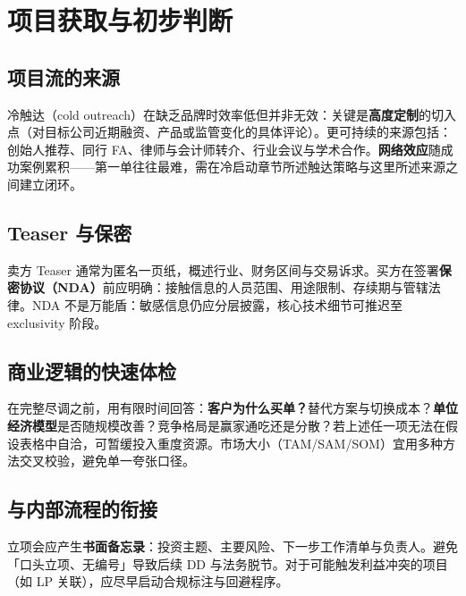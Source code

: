 \chapter{项目获取与初步判断}

\section{项目流的来源}

冷触达（cold outreach）在缺乏品牌时效率低但并非无效：关键是\textbf{高度定制}的切入点（对目标公司近期融资、产品或监管变化的具体评论）。更可持续的来源包括：创始人推荐、同行 FA、律师与会计师转介、行业会议与学术合作。\textbf{网络效应}随成功案例累积——第一单往往最难，需在冷启动章节所述触达策略与这里所述来源之间建立闭环。

\section{Teaser 与保密}

卖方 Teaser 通常为匿名一页纸，概述行业、财务区间与交易诉求。买方在签署\textbf{保密协议（NDA）}前应明确：接触信息的人员范围、用途限制、存续期与管辖法律。NDA 不是万能盾：敏感信息仍应分层披露，核心技术细节可推迟至 exclusivity 阶段。

\section{商业逻辑的快速体检}

在完整尽调之前，用有限时间回答：\textbf{客户为什么买单？}替代方案与切换成本？\textbf{单位经济模型}是否随规模改善？竞争格局是赢家通吃还是分散？若上述任一项无法在假设表格中自洽，可暂缓投入重度资源。市场大小（TAM/SAM/SOM）宜用多种方法交叉校验，避免单一夸张口径。

\section{与内部流程的衔接}

立项会应产生\textbf{书面备忘录}：投资主题、主要风险、下一步工作清单与负责人。避免「口头立项、无编号」导致后续 DD 与法务脱节。对于可能触发利益冲突的项目（如 LP 关联），应尽早启动合规标注与回避程序。
